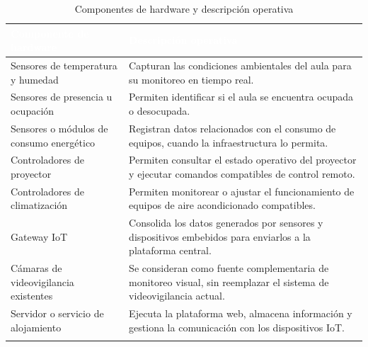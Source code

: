 \begingroup
\small
\begin{longtable}{|P{0.5000}|P{0.5000}|}
\hline
{}\textcolor{white}{\textbf{Componente de hardware}} & \textcolor{white}{\textbf{Descripción operativa}} \\ \hline
Sensores de temperatura y humedad & Capturan las condiciones ambientales del aula para su monitoreo en tiempo real. \\ \hline
Sensores de presencia u ocupación & Permiten identificar si el aula se encuentra ocupada o desocupada. \\ \hline
Sensores o módulos de consumo energético & Registran datos relacionados con el consumo de equipos, cuando la infraestructura lo permita. \\ \hline
Controladores de proyector & Permiten consultar el estado operativo del proyector y ejecutar comandos compatibles de control remoto. \\ \hline
Controladores de climatización & Permiten monitorear o ajustar el funcionamiento de equipos de aire acondicionado compatibles. \\ \hline
Gateway IoT & Consolida los datos generados por sensores y dispositivos embebidos para enviarlos a la plataforma central. \\ \hline
Cámaras de videovigilancia existentes & Se consideran como fuente complementaria de monitoreo visual, sin reemplazar el sistema de videovigilancia actual. \\ \hline
Servidor o servicio de alojamiento & Ejecuta la plataforma web, almacena información y gestiona la comunicación con los dispositivos IoT. \\ \hline
\caption{Componentes de hardware y descripción operativa}
\end{longtable}
\endgroup

